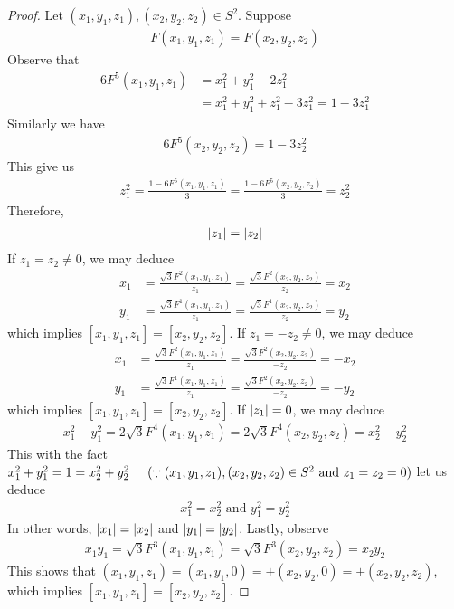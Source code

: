 \documentclass{report}
\begin{document}
\begin{proof}
Let $(x_1,y_1,z_1),(x_2,y_2,z_2)\in S^2$. Suppose 
\begin{align*}
F(x_1,y_1,z_1)=F(x_2,y_2,z_2)
\end{align*}
Observe that 
\begin{align*}
6F^5(x_1,y_1,z_1)&= x_1^2+y_1^2-2z_1^2 \\
&=x_1^2+y_1^2+z_1^2-3z_1^2=1-3z_1^2
\end{align*}
Similarly we have 
\begin{align*}
6F^5(x_2,y_2,z_2)=1-3z_2^2
\end{align*}
This give us 
\begin{align*}
z_1^2 = \frac{1-6F^5(x_1,y_1,z_1)}{3}= \frac{1-6F^5(x_2,y_2,z_2)}{3}=z_2^2
\end{align*}
Therefore, 
\begin{align*}
\left|z_1\right|=\left|z_2\right|
\end{align*}
If $z_1=z_2\neq 0$, we may deduce  
\begin{align*}
x_1&= \frac{\sqrt{3} F^2(x_1,y_1,z_1)}{z_1}= \frac{\sqrt{3}F^2(x_2,y_2,z_2) }{z_2}= x_2\\
y_1&= \frac{\sqrt{3} F^1(x_1,y_1,z_1)}{z_1}= \frac{\sqrt{3}F^1(x_2,y_2,z_2) }{z_2}= y_2
\end{align*}
which implies $[x_1,y_1,z_1]=[x_2,y_2,z_2]$. If $z_1=-z_2\neq 0$, we may deduce 
 \begin{align*}
x_1&= \frac{\sqrt{3}F^2 (x_1,y_1,z_1)}{z_1}= \frac{\sqrt{3}F^2(x_2,y_2,z_2) }{-z_2}= -x_2 \\
y_1&= \frac{\sqrt{3}F^1 (x_1,y_1,z_1)}{z_1}= \frac{\sqrt{3}F^2(x_2,y_2,z_2) }{-z_2}= -y_2
\end{align*}
which implies $[x_1,y_1,z_1]=[x_2,y_2,z_2]$. If $\left|z_1\right|=0$, we may deduce  
\begin{align*}
 x_1^2-y_1^2=2\sqrt{3}F^4(x_1,y_1,z_1)= 2\sqrt{3}F^4(x_2,y_2,z_2) =x_2^2-y_2^2
\end{align*}
This with the fact  $x_1^2+y_1^2=1=x_2^2+y_2^2\hspace{0.5cm}(\because (x_1,y_1,z_1),(x_2,y_2,z_2)\in S^2\text{ and }z_1=z_2=0)$ let us deduce 
 \begin{align*}
x_1^2=x_2^2\text{ and }y_1^2=y_2^2
\end{align*}
In other words,  $\left|x_1\right|=\left|x_2\right|$ and $\left|y_1\right|=\left|y_2\right|$. Lastly, observe 
\begin{align*}
x_1y_1=\sqrt{3}F^3(x_1,y_1,z_1)=\sqrt{3}F^3(x_2,y_2,z_2)=x_2y_2
\end{align*}
This shows that $(x_1,y_1,z_1)=(x_1,y_1,0)=\pm (x_2,y_2,0)= \pm (x_2,y_2,z_2)$, which implies $[x_1,y_1,z_1]=[x_2,y_2,z_2]$. 
\end{proof}
\end{document}
